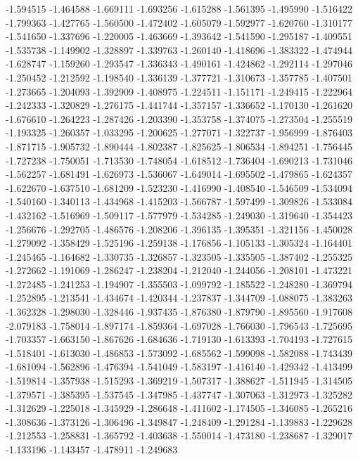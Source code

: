 -1.594515
-1.464588
-1.669111
-1.693256
-1.615288
-1.561395
-1.495990
-1.516422
-1.799363
-1.427765
-1.560500
-1.472402
-1.605079
-1.592977
-1.620760
-1.310177
-1.541650
-1.337696
-1.220005
-1.463669
-1.393642
-1.541590
-1.295187
-1.409551
-1.535738
-1.149902
-1.328897
-1.339763
-1.260140
-1.418696
-1.383322
-1.474944
-1.628747
-1.159260
-1.293547
-1.336343
-1.490161
-1.424862
-1.292114
-1.297046
-1.250452
-1.212592
-1.198540
-1.336139
-1.377721
-1.310673
-1.357785
-1.407501
-1.273665
-1.204093
-1.392909
-1.408975
-1.224511
-1.151171
-1.249415
-1.222964
-1.242333
-1.320829
-1.276175
-1.441744
-1.357157
-1.336652
-1.170130
-1.261620
-1.676610
-1.264223
-1.287426
-1.203390
-1.353758
-1.374075
-1.273504
-1.255519
-1.193325
-1.260357
-1.033295
-1.200625
-1.277071
-1.322737
-1.956999
-1.876403
-1.871715
-1.905732
-1.890444
-1.802387
-1.825625
-1.806534
-1.894251
-1.756445
-1.727238
-1.750051
-1.713530
-1.748054
-1.618512
-1.736404
-1.690213
-1.731046
-1.562257
-1.681491
-1.626973
-1.536067
-1.649014
-1.695502
-1.479865
-1.624357
-1.622670
-1.637510
-1.681209
-1.523230
-1.416990
-1.408540
-1.546509
-1.534094
-1.540160
-1.340113
-1.434968
-1.415203
-1.566787
-1.597499
-1.309826
-1.533084
-1.432162
-1.516969
-1.509117
-1.577979
-1.534285
-1.249030
-1.319640
-1.354423
-1.256676
-1.292705
-1.486576
-1.208206
-1.396135
-1.395351
-1.321156
-1.450028
-1.279092
-1.358429
-1.525196
-1.259138
-1.176856
-1.105133
-1.305324
-1.164401
-1.245465
-1.164682
-1.330735
-1.326857
-1.323505
-1.335505
-1.387402
-1.255325
-1.272662
-1.191069
-1.286247
-1.238204
-1.212040
-1.244056
-1.208101
-1.473221
-1.272485
-1.241253
-1.194907
-1.355503
-1.099792
-1.185522
-1.248280
-1.369794
-1.252895
-1.213541
-1.434674
-1.420344
-1.237837
-1.344709
-1.088075
-1.383263
-1.362328
-1.298030
-1.328446
-1.937435
-1.876380
-1.879790
-1.895560
-1.917608
-2.079183
-1.758014
-1.897174
-1.859364
-1.697028
-1.766030
-1.796543
-1.725695
-1.703357
-1.663150
-1.867626
-1.684636
-1.719130
-1.613393
-1.704193
-1.727615
-1.518401
-1.613030
-1.486853
-1.573092
-1.685562
-1.599098
-1.582088
-1.743439
-1.681094
-1.562896
-1.476394
-1.541049
-1.583197
-1.416140
-1.429342
-1.413499
-1.519814
-1.357938
-1.515293
-1.369219
-1.507317
-1.388627
-1.511945
-1.314505
-1.379571
-1.385395
-1.537545
-1.347985
-1.437747
-1.307063
-1.312973
-1.325282
-1.312629
-1.225018
-1.345929
-1.286648
-1.411602
-1.174505
-1.346085
-1.265216
-1.308636
-1.373126
-1.306496
-1.349847
-1.248409
-1.291284
-1.139883
-1.229628
-1.212553
-1.258831
-1.365792
-1.403638
-1.550014
-1.473180
-1.238687
-1.329017
-1.133196
-1.143457
-1.478911
-1.249683
